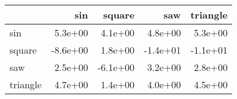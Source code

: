 \begin{tabular}{lrrrr}
\toprule
{} &      sin &   square &      saw &  triangle \\
\midrule
sin      &  5.3e+00 &  4.1e+00 &  4.8e+00 &   5.3e+00 \\
square   & -8.6e+00 &  1.8e+00 & -1.4e+01 &  -1.1e+01 \\
saw      &  2.5e+00 & -6.1e+00 &  3.2e+00 &   2.8e+00 \\
triangle &  4.7e+00 &  1.4e+00 &  4.0e+00 &   4.5e+00 \\
\bottomrule
\end{tabular}
